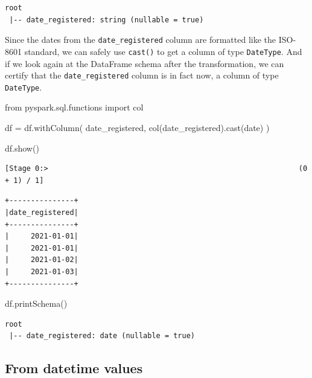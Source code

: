 \documentclass[
  11pt,
  letterpaper,
  DIV=11,
  numbers=noendperiod]{scrreprt}
\newenvironment{Shaded}{\begin{snugshade}}{\end{snugshade}}
\newcommand{\ImportTok}[1]{\textcolor[rgb]{0.00,0.46,0.62}{#1}}
\newcommand{\NormalTok}[1]{\textcolor[rgb]{0.00,0.23,0.31}{#1}}
\newcommand{\OperatorTok}[1]{\textcolor[rgb]{0.37,0.37,0.37}{#1}}
\newcommand{\StringTok}[1]{\textcolor[rgb]{0.13,0.47,0.30}{#1}}
\begin{document}
\begin{verbatim}
root
 |-- date_registered: string (nullable = true)
\end{verbatim}

Since the dates from the \texttt{date\_registered} column are formatted
like the ISO-8601 standard, we can safely use \texttt{cast()} to get a
column of type \texttt{DateType}. And if we look again at the DataFrame
schema after the transformation, we can certify that the
\texttt{date\_registered} column is in fact now, a column of type
\texttt{DateType}.

\begin{Shaded}
\begin{Highlighting}[]
\ImportTok{from}\NormalTok{ pyspark.sql.functions }\ImportTok{import}\NormalTok{ col}

\NormalTok{df }\OperatorTok{=}\NormalTok{ df.withColumn(}
    \StringTok{\textquotesingle{}date\_registered\textquotesingle{}}\NormalTok{,}
\NormalTok{    col(}\StringTok{\textquotesingle{}date\_registered\textquotesingle{}}\NormalTok{).cast(}\StringTok{\textquotesingle{}date\textquotesingle{}}\NormalTok{)}
\NormalTok{)}

\NormalTok{df.show()}
\end{Highlighting}
\end{Shaded}

\begin{verbatim}
[Stage 0:>                                                          (0 + 1) / 1]                                                                                
\end{verbatim}

\begin{verbatim}
+---------------+
|date_registered|
+---------------+
|     2021-01-01|
|     2021-01-01|
|     2021-01-02|
|     2021-01-03|
+---------------+
\end{verbatim}

\begin{Shaded}
\begin{Highlighting}[]
\NormalTok{df.printSchema()}
\end{Highlighting}
\end{Shaded}

\begin{verbatim}
root
 |-- date_registered: date (nullable = true)
\end{verbatim}

\hypertarget{from-datetime-values}{%
\subsection{From datetime values}\label{from-datetime-values}}
\end{document}
